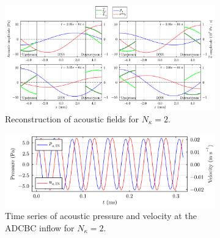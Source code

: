 \begin{figure}[t]
\centering
\begin{subfigure}{0.99\textwidth}
\centering
\includegraphics[scale=0.29]{assets/graphs/ac-plot-3-4_long.pdf}
\caption{Reconstruction of acoustic fields for $N_κ = 2$.}
\label{fig:ac-wave-later}
\end{subfigure}

\vspace*{0.5em}

\begin{subfigure}{0.99\textwidth}
\centering
\includegraphics[scale=0.29]{assets/graphs/up_plot_wave.pdf}
\caption{Time series of acoustic pressure and velocity at the ADCBC inflow for $N_κ = 2$.}
\label{fig:up_plot_wave}
\end{subfigure}
\caption{}
\label{fig:wave-later}
\end{figure}

